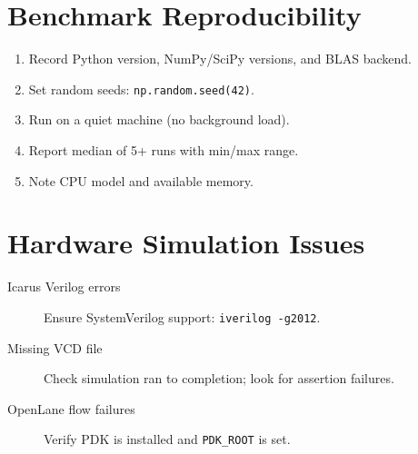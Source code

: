 \documentclass[11pt, a4paper, openany]{book}
\theoremstyle{definition}
\begin{document}
\section{Benchmark Reproducibility}
\begin{enumerate}
    \item Record Python version, NumPy/SciPy versions, and BLAS backend.
    \item Set random seeds: \texttt{np.random.seed(42)}.
    \item Run on a quiet machine (no background load).
    \item Report median of 5+ runs with min/max range.
    \item Note CPU model and available memory.
\end{enumerate}

\section{Hardware Simulation Issues}
\begin{description}
    \item[Icarus Verilog errors] Ensure SystemVerilog support: \texttt{iverilog -g2012}.
    \item[Missing VCD file] Check simulation ran to completion; look for assertion failures.
    \item[OpenLane flow failures] Verify PDK is installed and \texttt{PDK\_ROOT} is set.
\end{description}
\end{document}
